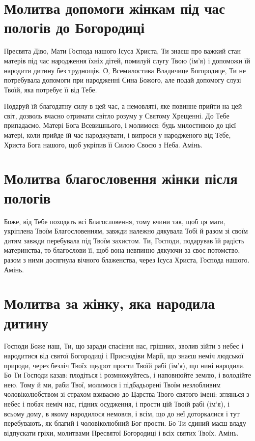 \documentclass[chapters.tex]{subfiles}
\begin{document}
\section{Молитва допомоги жінкам під час пологів до Богородиці}
Пресвята Діво, Мати Господа нашого Ісуса Христа, Ти знаєш про важкий стан матерів під час народження їхніх дітей, помилуй слугу Твою (ім’я) і допоможи їй народити дитину без труднощів. О, Всемилостива Владичице Богородице, Ти не потребувала допомоги при народженні Сина Божого, але подай допомогу слузі Твоїй, яка потребує її від Тебе.

Подаруй їй благодатну силу в цей час, а немовляті, яке повинне прийти на цей світ, дозволь вчасно отримати світло розуму у Святому Хрещенні. До Тебе припадаємо, Матері Бога Всевишнього, і молимося: будь милостивою до цієї матері, коли прийде їй час народжувати, і випроси у народженого від Тебе, Христа Бога нашого, щоб укріпив її Силою Своєю з Неба. Амінь.

\section{Молитва благословення жінки після пологів}
Боже, від Тебе походять всі Благословення, тому вчини так, щоб ця мати, укріплена Твоїм Благословенням, завжди належно дякувала Тобі й разом зі своїм дитям завжди перебувала під Твоїм захистом. Ти, Господи, подарував їй радість материнства, то благослови її, щоб вона невпинно дякуючи за своє потомство, разом з ними досягнула вічного блаженства, через Ісуса Христа, Господа нашого. Амінь.

\section{Молитва за жінку, яка народила дитину}
Господи Боже наш, Ти, що заради спасіння нас, грішних, зволив зійти з небес і народитися від святої Богородиці і Приснодіви Марії, що знаєш неміч людської природи, через безліч Твоїх щедрот прости Твоїй рабі (ім’я), що нині народила. Бо Ти Господи казав: плодіться і розмножуйтесь, і наповнюйте землю, і володійте нею. Тому й ми, раби Твої, молимося і підбадьорені Твоїм незлобливим чоловіколюбством зі страхом взиваємо до Царства Твого святого імені: зглянься з небес і побач неміч нас, гідних осудження, і прости цій Твоїй рабі (ім’я), і всьому дому, в якому народилося немовля, і всім, що до неї доторкалися і тут перебувають, як благий і чоловіколюбний Бог прости. Бо Ти єдиний маєш владу відпускати гріхи, молитвами Пресвятої Богородиці і всіх святих Твоїх. Амінь.
\end{document}

